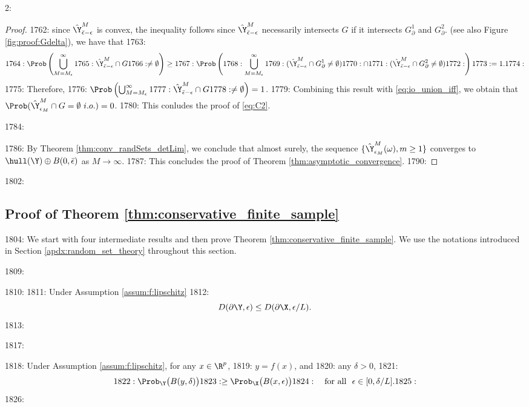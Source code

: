 2: \documentclass[12pt]{l4dc2022} %
\begin{document}
\begin{proof}
{1762: since  $\hat\Y^M_{\bar{\epsilon}-\epsilon}$ is convex,  the inequality follows since  $\hat\Y^M_{\bar{\epsilon}-\epsilon}$ necessarily intersects $G$ if it intersects $G_\partial^1$ and $G_\partial^2$. } (see also Figure \ref{fig:proof:Gdelta}), we have that
1763: \begin{align*}\label{eq:prob_YM_cap_G_neq_empty_is_1}
1764: \Prob\left(\bigcup_{M=M_\epsilon}^\infty
1765: \hat\Y^M_{\bar{\epsilon}-\epsilon}\cap G
1766: \neq\emptyset\right)\geq
1767: \Prob\left(
1768: \bigcup_{M=M_\epsilon}^\infty
1769: (\hat\Y^M_{\bar{\epsilon}-\epsilon}\cap G_\partial^1\neq\emptyset)
1770: \cap
1771: (\hat\Y^M_{\bar{\epsilon}-\epsilon}\cap G_\partial^2\neq\emptyset)
1772: \right)
1773: =1.
1774: \end{align*}
1775: Therefore, 
1776: $\Prob\left(\bigcup_{M=M_\epsilon}^\infty
1777: \hat\Y^M_{\bar{\epsilon}-\epsilon}\cap G
1778: \neq\emptyset\right)=1$. 
1779: Combining this result with \eqref{eq:io_union_iff}, we obtain that $\Prob(\hat\Y^M_{\epsilon_M}\cap G = \emptyset \ i.o.) = 0$. 
1780: This conludes the proof of \eqref{eq:C2}. 

1784: \vspace{2mm}

1786: By Theorem \ref{thm:conv_randSets_detLim}, we conclude that almost surely, the sequence $\{\hat\Y^M_{\epsilon_M}(\omega),m\geq 1\}$  converges to $\hull(\Y)\oplus B(0,\bar{\epsilon})$ as $M\rightarrow\infty$. 
1787: This concludes the proof of Theorem \ref{thm:asymptotic_convergence}.
1790: \end{proof}

1802: \subsection{Proof of Theorem \ref{thm:conservative_finite_sample}}\label{apdx:proof:thm:conservative_finite_sample}

1804: We start with four intermediate results and then prove Theorem \ref{thm:conservative_finite_sample}. We use the notations introduced in Section \ref{apdx:random_set_theory} throughout this section.

1809: \begin{lemma}%
1810: \label{lem:dX_packing_nb_Lip}
1811: Under Assumption \ref{assum:f:lipschitz}  
1812: $$D(\partial\Y,\epsilon)\leq D(\partial\X,\epsilon/L).$$ 
1813: \end{lemma}

1817: \begin{lemma}%
1818: \label{lem:Xball_coverage_prob} Under Assumption \ref{assum:f:lipschitz}, for any $x\in\R^p$, 
1819: $y=f(x)$, and 
1820: any $\delta>0$, %
1821: $$
1822: \Prob_\Y\big(B(y,\delta)\big)
1823: \geq \Prob_\X\big(B(x,\epsilon)\big)
1824: \quad \text{for all }\ \epsilon\in [0,\delta/L].
1825: $$
1826: \end{lemma}
\end{document}
